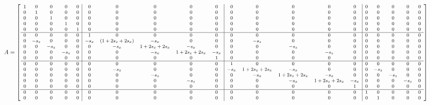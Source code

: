 \begin{landscape}
        \centering %
\begin{equation}
\setcounter{MaxMatrixCols}{20}
\footnotesize{
A = \begin{bmatrix}
    \begin{array}{ccccc|ccccc|ccccc|ccccc}
       1 & 0 & 0 & 0 & 0 & 0 & 0 & 0 & 0 & 0 & 0 & 0 & 0 & 0 & 0 & 0 & 0 & 0 & 0 & 0 \\ %
       0 & 1 & 0 & 0 & 0 & 0 & 0 & 0 & 0 & 0 & 0 & 0 & 0 & 0 & 0 & 0 & 0 & 0 & 0 & 0 \\ %
       0 & 0 & 1 & 0 & 0 & 0 & 0 & 0 & 0 & 0 & 0 & 0 & 0 & 0 & 0 & 0 & 0 & 0 & 0 & 0 \\ %
       0 & 0 & 0 & 1 & 0 & 0 & 0 & 0 & 0 & 0 & 0 & 0 & 0 & 0 & 0 & 0 & 0 & 0 & 0 & 0 \\ %
       0 & 0 & 0 & 0 & 1 & 0 & 0 & 0 & 0 & 0 & 0 & 0 & 0 & 0 & 0 & 0 & 0 & 0 & 0 & 0 \\ %
         \hline
       0 & 0 & 0 & 0 & 0 & 1 & 0 & 0 & 0 & 0 & 0 & 0 & 0 & 0 & 0 & 0 & 0 & 0 & 0 & 0 \\ %
       0 & -s_z & 0 & 0 & 0 & -s_x & (1+2s_z+2s_x) & -s_x & 0 & 0 & 0 & -s_z & 0 & 0 & 0 & 0 & 0 & 0 & 0 & 0 \\ %
       0 & 0 & -s_z & 0 & 0 & 0 & -s_x & 1+2s_z+2s_x & -s_x & 0 & 0 & 0 & -s_z & 0 & 0 & 0 & 0 & 0 & 0 & 0 \\ %
       0 & 0 & 0 & -s_z & 0 & 0 & 0 & -s_x & 1+2s_z+2s_x & -s_x & 0 & 0 & 0 & -s_z & 0 & 0 & 0 & 0 & 0 & 0 \\ %
       0 & 0 & 0 & 0 & 0 & 0 & 0 & 0 & 0 & 1 & 0 & 0 & 0 & 0 & 0 & 0 & 0 & 0 & 0 & 0 \\ %
          \hline
       0 & 0 & 0 & 0 & 0 & 0 & 0 & 0 & 0 & 0 & 1 & 0 & 0 & 0 & 0 & 0 & 0 & 0 & 0 & 0 \\ %
       0 & 0 & 0 & 0 & 0 & 0 & -s_z & 0 & 0 & 0 & -s_x & 1+2s_z+2s_x & -s_x & 0 & 0 & 0 & -s_z & 0 & 0 & 0 \\ %
       0 & 0 & 0 & 0 & 0 & 0 & 0 & -s_z & 0 & 0 & 0 & -s_x & 1+2s_z+2s_x & -s_x & 0 & 0 & 0 & -s_z & 0 & 0 \\ %
       0 & 0 & 0 & 0 & 0 & 0 & 0 & 0 & -s_z & 0 & 0 & 0 & -s_x & 1+2s_z+2s_x & -s_x & 0 & 0 & 0 & -s_z & 0 \\ %
       0 & 0 & 0 & 0 & 0 & 0 & 0 & 0 & 0 & 0 & 0 & 0 & 0 & 0 & 1 & 0 & 0 & 0 & 0 & 0 \\ %
         \hline
       0 & 0 & 0 & 0 & 0 & 0 & 0 & 0 & 0 & 0 & 0 & 0 & 0 & 0 & 0 & 1 & 0 & 0 & 0 & 0 \\ %
       0 & 0 & 0 & 0 & 0 & 0 & 0 & 0 & 0 & 0 & 0 & 0 & 0 & 0 & 0 & 0 & 1 & 0 & 0 & 0 \\ %

\end{array}
\end{bmatrix}}
\end{equation}
\end{landscape}
